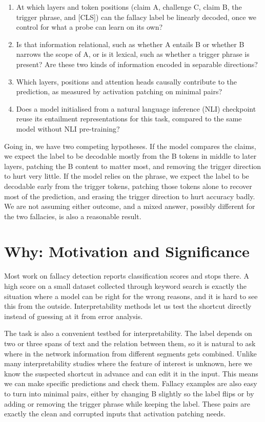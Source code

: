 \documentclass[11pt,a4paper]{article}
\begin{document}
\begin{enumerate}[leftmargin=*]
  \item At which layers and token positions (claim A, challenge C, claim B, the trigger phrase, and [CLS]) can the fallacy label be linearly decoded, once we control for what a probe can learn on its own?
  \item Is that information relational, such as whether A entails B or whether B narrows the scope of A, or is it lexical, such as whether a trigger phrase is present? Are these two kinds of information encoded in separable directions?
  \item Which layers, positions and attention heads causally contribute to the prediction, as measured by activation patching on minimal pairs?
  \item Does a model initialised from a natural language inference (NLI) checkpoint reuse its entailment representations for this task, compared to the same model without NLI pre-training?
\end{enumerate}

Going in, we have two competing hypotheses. If the model compares the claims, we expect the label to be decodable mostly from the B tokens in middle to later layers, patching the B content to matter most, and removing the trigger direction to hurt very little. If the model relies on the phrase, we expect the label to be decodable early from the trigger tokens, patching those tokens alone to recover most of the prediction, and erasing the trigger direction to hurt accuracy badly. We are not assuming either outcome, and a mixed answer, possibly different for the two fallacies, is also a reasonable result.

\section{Why: Motivation and Significance}

Most work on fallacy detection reports classification scores and stops there. A high score on a small dataset collected through keyword search is exactly the situation where a model can be right for the wrong reasons, and it is hard to see this from the outside. Interpretability methods let us test the shortcut directly instead of guessing at it from error analysis.

The task is also a convenient testbed for interpretability. The label depends on two or three spans of text and the relation between them, so it is natural to ask where in the network information from different segments gets combined. Unlike many interpretability studies where the feature of interest is unknown, here we know the suspected shortcut in advance and can edit it in the input. This means we can make specific predictions and check them. Fallacy examples are also easy to turn into minimal pairs, either by changing B slightly so the label flips or by adding or removing the trigger phrase while keeping the label. These pairs are exactly the clean and corrupted inputs that activation patching needs.
\end{document}
